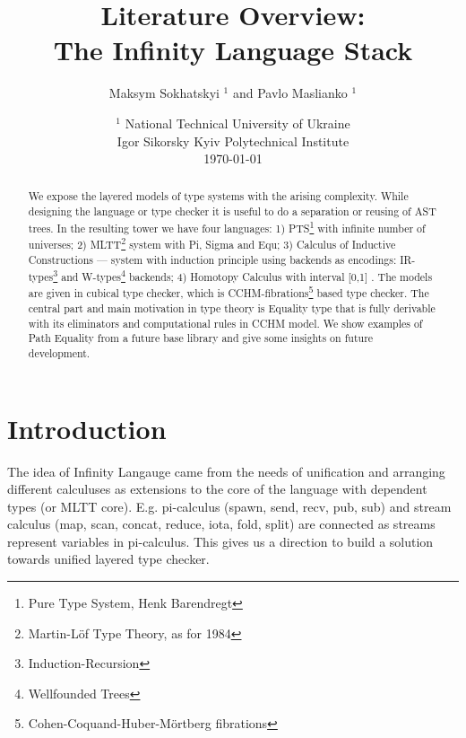 \documentclass{article}
\begin{document}
\title{Literature Overview:\\ The Infinity Language Stack}
\author{Maksym Sokhatskyi $^1$ and Pavlo Maslianko $^1$}
\date{
    $^1$ National Technical University of Ukraine \\
    \small Igor Sikorsky Kyiv Polytechnical Institute\\
    \today
}

\maketitle

\begin{abstract}
We expose the layered models of type systems with the arising complexity.
While designing the language or type checker it is useful to do a separation or reusing of AST trees.
In the resulting tower we have four languages:
1) PTS\footnote{Pure Type System, Henk Barendregt} \cite{Erik97} with infinite number of universes;
2) MLTT\footnote{Martin-Löf Type Theory, as for 1984} \cite{Lof84} system with Pi, Sigma and Equ;
3) Calculus of Inductive Constructions \cite{Mohring15} --- system with induction principle using backends as
encodings: IR-types\footnote{Induction-Recursion} \cite{Dagand13} and W-types\footnote{Wellfounded Trees} backends;
4) Homotopy Calculus with interval [0,1] \cite{Mortberg17}. The models are given in cubical type checker,
which is CCHM-fibrations\footnote{Cohen-Coquand-Huber-Mörtberg fibrations} \cite{Orton17} based type checker.
The central part and main motivation in type theory is Equality type that is fully
derivable with its eliminators and computational rules in CCHM model. We show examples of
Path Equality from a future base library and give some insights on future development.
\end{abstract}

\newpage
\tableofcontents
\newpage

\section{Introduction}
The idea of Infinity Langauge came from the needs of unification and
arranging different calculuses as extensions to the core of the language
with dependent types (or MLTT core). E.g. pi-calculus (spawn, send, recv, pub, sub)
and stream calculus (map, scan, concat, reduce, iota, fold, split) are connected
as streams represent variables in pi-calculus. This gives us a direction to build
a solution towards unified layered type checker.
\end{document}
